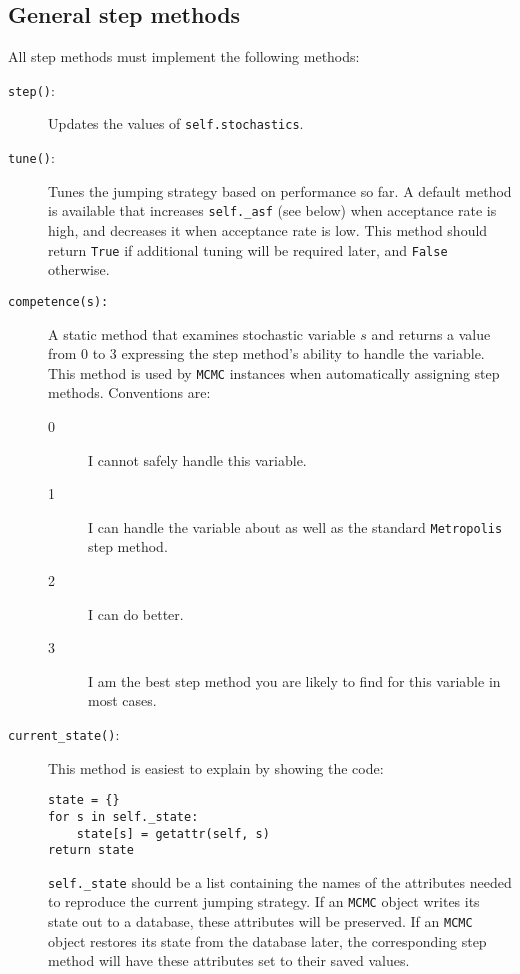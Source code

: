 \hypertarget{user-gen}{}
\subsection*{General step methods} \label{user-gen}

All step methods must implement the following methods:
\begin{description}
   \item[\texttt{step()}:] Updates the values of \texttt{self.stochastics}.
   \item[\texttt{tune()}:] Tunes the jumping strategy based on performance so far. A default method is available that increases \texttt{self._asf} (see below) when acceptance rate is high, and decreases it when acceptance rate is low. This method should return \texttt{True} if additional tuning will be required later, and \texttt{False} otherwise.
   \item[\texttt{competence(s):}] A static method that examines stochastic variable $s$ and returns a value from 0 to 3 expressing the step method's ability to handle the variable. This method is used by \texttt{MCMC} instances when automatically assigning step methods. Conventions are:
   \begin{description}
      \item[0] I cannot safely handle this variable. 
      \item[1] I can handle the variable about as well as the standard \texttt{Metropolis} step method.
      \item[2] I can do better.
      \item[3] I am the best step method you are likely to find for this variable in most cases.
   \end{description}
   \item[\texttt{current_state()}:] This method is easiest to explain by showing the code:
   \begin{verbatim}
state = {}
for s in self._state:
    state[s] = getattr(self, s)
return state      
   \end{verbatim}
   \texttt{self._state} should be a list containing the names of the attributes needed to reproduce the current jumping strategy. If an \texttt{MCMC} object writes its state out to a database, these attributes will be preserved. If an \texttt{MCMC} object restores its state from the database later, the corresponding step method will have these attributes set to their saved values.
\end{description}

